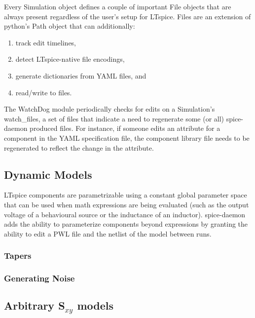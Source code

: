 \documentclass{article}
\newcommand{\cf}[1]{\textsf{#1}}
\begin{document}
Every \cf{Simulation} object defines a couple of important \cf{File} objects that are always present regardless
of the user's setup for LTspice. \cf{File}s are an extension of python's \cf{Path} object that can additionally:
\begin{enumerate}
    \item track edit timelines,
    \item detect LTspice-native file encodings,
    \item generate dictionaries from YAML files, and
    \item read/write to files.
\end{enumerate}

The \cf{WatchDog} module periodically checks for edits on a \cf{Simulation}'s \cf{watch\_files},
a set of files that indicate a need to regenerate some (or all) spice-daemon produced files.
For instance, if someone edits an attribute for a component in the YAML specification file, 
the component library file needs to be regenerated to reflect the change in the attribute.



\subsection{Dynamic Models}

LTspice components are parametrizable using a constant global parameter space that can be used when
math expressions are being evaluated (such as the output voltage of a behavioural source or the inductance 
of an inductor). spice-daemon adds the ability to parameterize components beyond expressions by granting the
ability to edit a PWL file and the netlist of the model between runs.

\subsubsection{Tapers}

\subsubsection{Generating Noise}

\subsection{Arbitrary S$_{xy}$ models}
\end{document}
